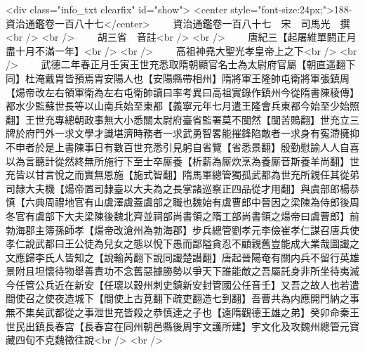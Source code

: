 <div class="info_txt clearfix" id="show">
<center style="font-size:24px;">188-資治通鑑卷一百八十七</center>
  　　資治通鑑卷一百八十七　宋　司馬光　撰<br />
<br />
　　胡三省　音註<br />
<br />
　　唐紀三【起屠維單閼正月盡十月不滿一年】<br />
<br />
　　高祖神堯大聖光孝皇帝上之下<br />
<br />
　　武德二年春正月壬寅王世充悉取隋朝顯官名士為太尉府官屬【朝直遥翻下同】杜淹戴胄皆預焉胄安陽人也【安陽縣帶相州】隋將軍王隆帥屯衛將軍張鎮周【煬帝改左右領軍衛為左右屯衛帥讀曰率考異曰高祖實錄作鎮州今從隋書陳稜傳】都水少監蘇世長等以山南兵始至東都【義寧元年七月遣王隆會兵東都今始至少始照翻】王世充專總朝政事無大小悉關太尉府臺省監署莫不闃然【闃苦鵙翻】世充立三牌於府門外一求文學才識堪濟時務者一求武勇智畧能摧鋒陷敵者一求身有寃滯擁抑不申者於是上書陳事日有數百世充悉引見躬自省覽【省悉景翻】殷勤慰諭人人自喜以為言聽計從然終無所施行下至士卒厮養【析薪為厮炊烹為養厮音斯養羊尚翻】世充皆以甘言悅之而實無恩施【施式智翻】隋馬軍總管獨孤武都為世充所親任其從弟司隸大夫機【煬帝置司隸臺以大夫為之長掌諸巡察正四品從才用翻】與虞部郎楊恭慎【六典周禮地官有山虞澤虞蓋虞部之職也魏始有虞曹郎中晉因之梁陳為侍郎後周冬官有虞部下大夫梁陳後魏北齊並祠部尚書領之隋工部尚書領之煬帝曰虞曹郎】前勃海郡主簿孫師孝【煬帝改滄州為勃海郡】步兵總管劉孝元李儉崔孝仁謀召唐兵使孝仁說武都曰王公徒為兒女之態以悅下愚而鄙隘貪忍不顧親舊豈能成大業哉圖䜟之文應歸李氏人皆知之【說輸芮翻下說同䜟楚譖翻】唐起晉陽奄有關内兵不留行英雄景附且坦懷待物舉善責功不念舊惡據勝勢以爭天下誰能敵之吾屬託身非所坐待夷滅今任管公兵近在新安【任瓌以穀州刺史鎮新安封管國公任音壬】又吾之故人也若遣間使召之使夜造城下【間使上古莧翻下疏吏翻造七到翻】吾曹共為内應開門納之事無不集矣武都從之事泄世充皆殺之恭慎達之子也【遠隋觀德王雄之弟】癸卯命秦王世民出鎮長春宫【長春宫在同州朝邑縣後周宇文護所建】宇文化及攻魏州總管元寶藏四旬不克魏徵往說<br />
<br />
